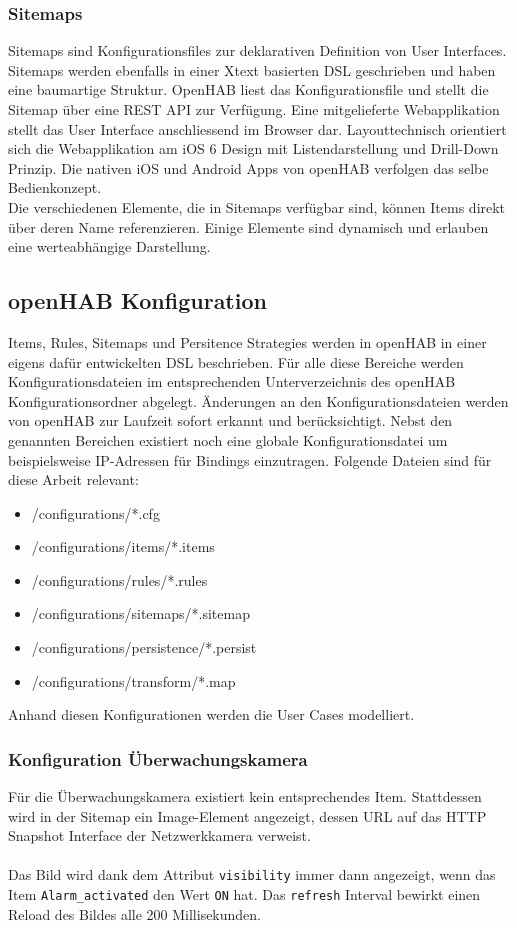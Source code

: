 \subsubsection{Sitemaps}
Sitemaps sind Konfigurationsfiles zur deklarativen Definition von User Interfaces. Sitemaps werden ebenfalls in einer Xtext basierten DSL geschrieben und haben eine baumartige Struktur. OpenHAB liest das Konfigurationsfile und stellt die Sitemap über eine REST API zur Verfügung. Eine mitgelieferte Webapplikation stellt das User Interface anschliessend im Browser dar. Layouttechnisch orientiert sich die Webapplikation am iOS 6 Design mit Listendarstellung und Drill-Down Prinzip. Die nativen iOS und Android Apps von openHAB verfolgen das selbe Bedienkonzept.\\
Die verschiedenen Elemente, die in Sitemaps verfügbar sind, können Items direkt über deren Name referenzieren. Einige Elemente sind dynamisch und erlauben eine werteabhängige Darstellung.


\subsection{openHAB Konfiguration}
Items, Rules, Sitemaps und Persitence Strategies werden in openHAB in einer eigens dafür entwickelten DSL beschrieben. Für alle diese Bereiche werden Konfigurationsdateien im entsprechenden Unterverzeichnis des openHAB Konfigurationsordner abgelegt. Änderungen an den Konfigurationsdateien werden von openHAB zur Laufzeit sofort erkannt und berücksichtigt. Nebst den genannten Bereichen existiert noch eine globale Konfigurationsdatei um beispielsweise IP-Adressen für Bindings einzutragen. Folgende Dateien sind für diese Arbeit relevant:

\begin{itemize}
	\item /configurations/*.cfg
	\item /configurations/items/*.items
	\item /configurations/rules/*.rules
	\item /configurations/sitemaps/*.sitemap
	\item /configurations/persistence/*.persist
	\item /configurations/transform/*.map
\end{itemize}

Anhand diesen Konfigurationen werden die User Cases modelliert.

\subsubsection{Konfiguration Überwachungskamera} 
Für die Überwachungskamera existiert kein entsprechendes Item. Stattdessen wird in der Sitemap ein Image-Element angezeigt, dessen URL auf das HTTP Snapshot Interface der Netzwerkkamera verweist.\\ \\
Das Bild wird dank dem Attribut \lstinline!visibility!  immer dann angezeigt, wenn das Item \lstinline!Alarm_activated! den Wert \lstinline!ON! hat. Das \lstinline!refresh! Interval bewirkt einen Reload des Bildes alle 200 Millisekunden.

